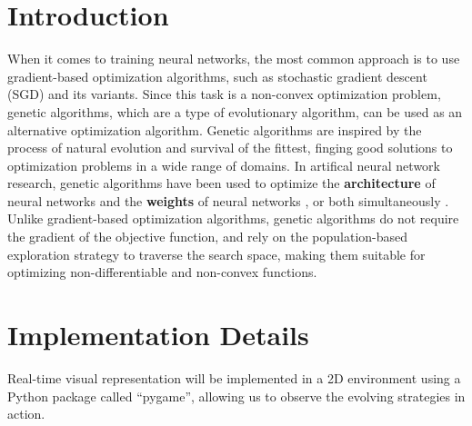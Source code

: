 \documentclass[sigconf]{acmart}
\begin{document}
\section{Introduction}
When it comes to training neural networks, the most common approach is to use gradient-based optimization algorithms, such as stochastic gradient descent (SGD) and its variants. Since this task is a non-convex optimization problem, genetic algorithms, which are a type of evolutionary algorithm, can be used as an alternative optimization algorithm. Genetic algorithms are inspired by the process of natural evolution and survival of the fittest, finging good solutions to optimization problems in a wide range of domains.
In artifical neural network research, genetic algorithms have been used to optimize the \textbf{architecture} of neural networks \cite{wu2021trainingNI} and the \textbf{weights} of neural networks \cite{NN_GA_DavidJ_10.5555/1623755.1623876}, or both simultaneously \cite{stanley2002evolving,NDE_Karl_10.1145/3067695.3075967}. Unlike gradient-based optimization algorithms, genetic algorithms do not require the gradient of the objective function, and rely on the population-based exploration strategy to traverse the search space, making them suitable for optimizing non-differentiable and non-convex functions. 

\section{Implementation Details}
Real-time visual representation will be implemented in a 2D environment using a Python package called ``pygame'', allowing us to observe the evolving strategies in action. 
\end{document}
